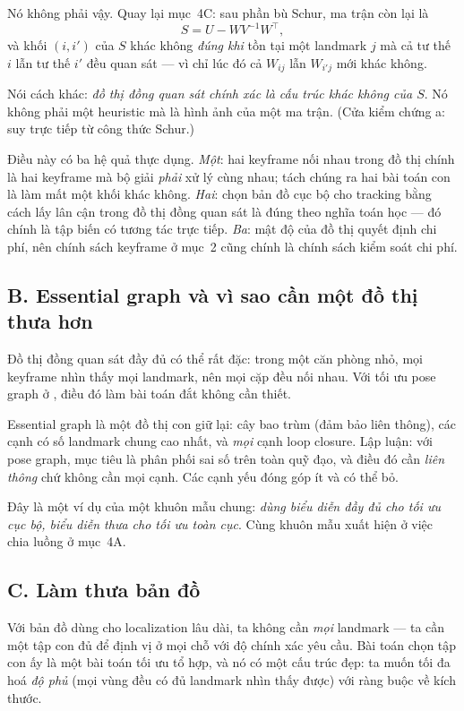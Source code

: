 \documentclass[../../vslam.tex]{subfiles}
\begin{document}
Nó không phải vậy. Quay lại  mục~4C: sau phần bù Schur, ma trận còn lại là
\[
S = U - W V^{-1} W^{\top},
\]
và khối \((i,i')\) của \(S\) khác không \emph{đúng khi} tồn tại một landmark \(j\) mà cả tư thế \(i\) lẫn tư thế \(i'\) đều quan sát --- vì chỉ lúc đó cả \(W_{ij}\) lẫn \(W_{i'j}\) mới khác không.

Nói cách khác: \emph{đồ thị đồng quan sát chính xác là cấu trúc khác không của \(S\)}. Nó không phải một heuristic mà là hình ảnh của một ma trận. (Cửa kiểm chứng a: suy trực tiếp từ công thức Schur.)

Điều này có ba hệ quả thực dụng. \emph{Một}: hai keyframe nối nhau trong đồ thị chính là hai keyframe mà bộ giải \emph{phải} xử lý cùng nhau; tách chúng ra hai bài toán con là làm mất một khối khác không. \emph{Hai}: chọn bản đồ cục bộ cho tracking bằng cách lấy lân cận trong đồ thị đồng quan sát là đúng theo nghĩa toán học --- đó chính là tập biến có tương tác trực tiếp. \emph{Ba}: mật độ của đồ thị quyết định chi phí, nên chính sách keyframe ở mục~2 cũng chính là chính sách kiểm soát chi phí.

\subsection{B. Essential graph và vì sao cần một đồ thị thưa hơn}

Đồ thị đồng quan sát đầy đủ có thể rất đặc: trong một căn phòng nhỏ, mọi keyframe nhìn thấy mọi landmark, nên mọi cặp đều nối nhau. Với tối ưu pose graph ở , điều đó làm bài toán đắt không cần thiết.

Essential graph là một đồ thị con giữ lại: cây bao trùm (đảm bảo liên thông), các cạnh có số landmark chung cao nhất, và \emph{mọi} cạnh loop closure. Lập luận: với pose graph, mục tiêu là phân phối sai số trên toàn quỹ đạo, và điều đó cần \emph{liên thông} chứ không cần mọi cạnh. Các cạnh yếu đóng góp ít và có thể bỏ.

Đây là một ví dụ của một khuôn mẫu chung: \emph{dùng biểu diễn đầy đủ cho tối ưu cục bộ, biểu diễn thưa cho tối ưu toàn cục}. Cùng khuôn mẫu xuất hiện ở việc chia luồng ở mục~4A.

\subsection{C. Làm thưa bản đồ}

Với bản đồ dùng cho localization lâu dài, ta không cần \emph{mọi} landmark --- ta cần một tập con đủ để định vị ở mọi chỗ với độ chính xác yêu cầu. Bài toán chọn tập con ấy là một bài toán tối ưu tổ hợp, và nó có một cấu trúc đẹp: ta muốn tối đa hoá \emph{độ phủ} (mọi vùng đều có đủ landmark nhìn thấy được) với ràng buộc về kích thước.
\end{document}
